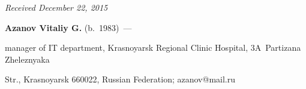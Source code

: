 \vspace*{-1pt}





\hfill{\small\textit{Received December 22, 2015}}


  


  \Contrl


  


  \noindent


  \textbf{Azanov Vitaliy G.} (b.\ 1983)~---


  manager of IT department, Krasnoyarsk Regional Clinic Hospital, 3A~Partizana Zheleznyaka 


Str., Krasnoyarsk 660022, Russian Federation; azanov@mail.ru


  


 \label{end\stat}








\renewcommand{\bibname}{\protect\rm Литература}


